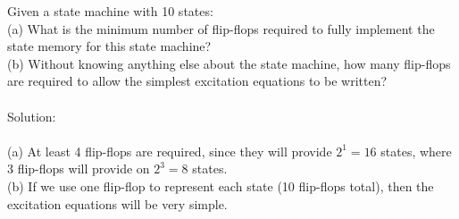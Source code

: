 Given a state machine with 10 states:\\
(a) What is the minimum number of flip-flops required to fully implement the state memory for this state machine?\\
(b) Without knowing anything else about the state machine, how many flip-flops are required to allow the simplest excitation equations to be written?\\ \\

Solution: \\ \\
(a) At least 4 flip-flops are required, since they will provide $2^1=16$ states, where 3 flip-flops will provide on $2^3=8$ states.\\
(b) If we use one flip-flop to represent each state (10 flip-flops total), then the excitation equations will be very simple.\\
